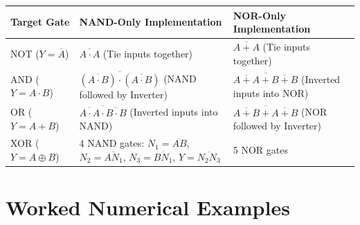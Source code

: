 \begin{center}
\begin{tabularx}{\textwidth}{l X X}
\toprule
\textbf{Target Gate} & \textbf{NAND-Only Implementation} & \textbf{NOR-Only Implementation} \\
\midrule
NOT ($Y = \overline{A}$) & $\overline{A \cdot A}$ (Tie inputs together) & $\overline{A + A}$ (Tie inputs together) \\
AND ($Y = A \cdot B$) & $\overline{(\overline{A \cdot B}) \cdot (\overline{A \cdot B})}$ (NAND followed by Inverter) & $\overline{\overline{A + A} + \overline{B + B}}$ (Inverted inputs into NOR) \\
OR ($Y = A + B$) & $\overline{\overline{A \cdot A} \cdot \overline{B \cdot B}}$ (Inverted inputs into NAND) & $\overline{\overline{A + B} + \overline{A + B}}$ (NOR followed by Inverter) \\
XOR ($Y = A \oplus B$) & 4 NAND gates: $N_1 = \overline{AB}$, $N_2 = \overline{A N_1}$, $N_3 = \overline{B N_1}$, $Y = \overline{N_2 N_3}$ & 5 NOR gates \\
\bottomrule
\end{tabularx}
\end{center}

\section{Worked Numerical Examples}

